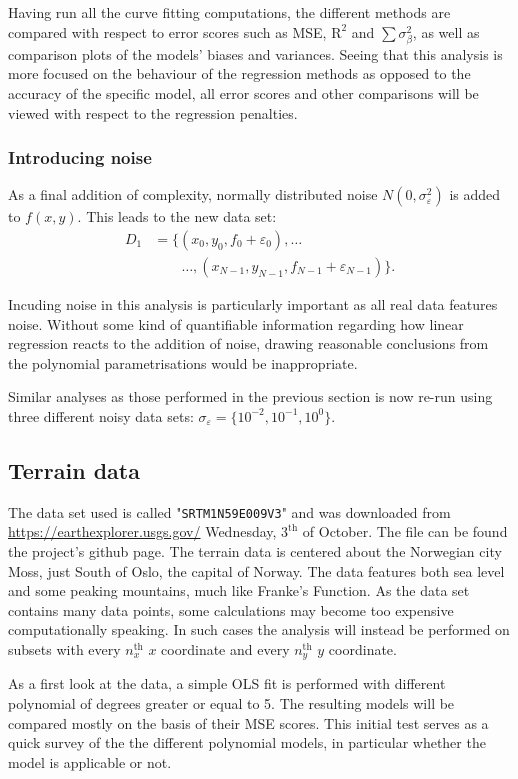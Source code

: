 \documentclass[reprint,english]{revtex4-1}
\begin{document}
Having run all the curve fitting computations, the different methods are compared with respect to error scores such as MSE, \(\text{R}^2\) and \(\sum\sigma_{\beta}^2\), as well as comparison plots of the models' biases and variances. Seeing that this analysis is more focused on the behaviour of the regression methods as opposed to the accuracy of the specific model, all error scores and other comparisons will be viewed with respect to the regression penalties.
\subsubsection{Introducing noise}\label{sec:Franke:with_noise}
As a final addition of complexity, normally distributed noise \(N(0,\sigma_{\varepsilon}^2)\) is added to \(f(x,y)\). This leads to the new data set:
\begin{align}
D_1&=\{(x_0,y_0,f_0+\varepsilon_0),\ldots\nonumber\\
&\qquad\ldots,(x_{N-1},y_{N-1},f_{N-1}+\varepsilon_{N-1})\}.
\end{align}

Incuding noise in this analysis is particularly important as all real data features noise. Without some kind of quantifiable information regarding how linear regression reacts to the addition of noise, drawing reasonable conclusions from the polynomial parametrisations would be inappropriate.

Similar analyses as those performed in the previous section is now re-run using three different noisy data sets: \(\sigma_{\varepsilon}=\{10^{-2},10^{-1},10^0\}\).
\subsection{Terrain data}
The data set used is called "\texttt{SRTM1N59E009V3}" and was downloaded from \url{https://earthexplorer.usgs.gov/} Wednesday, \(3^{\text{th}}\) of October. The file can be found the project's github page. The terrain data is centered about the Norwegian city Moss, just South of Oslo, the capital of Norway. The data features both sea level and some peaking mountains, much like Franke's Function. As the data set contains many data points, some calculations may become too expensive computationally speaking. In such cases the analysis will instead be performed on subsets with every \(n_x^{\text{th}}\) \(x\) coordinate and every \(n_y^{\text{th}}\) \(y\) coordinate.

As a first look at the data, a simple OLS fit is performed with different polynomial of degrees greater or equal to 5. The resulting models will be compared mostly on the basis of their MSE scores. This initial test serves as a quick survey of the the different polynomial models, in particular whether the model is applicable or not.
\end{document}
